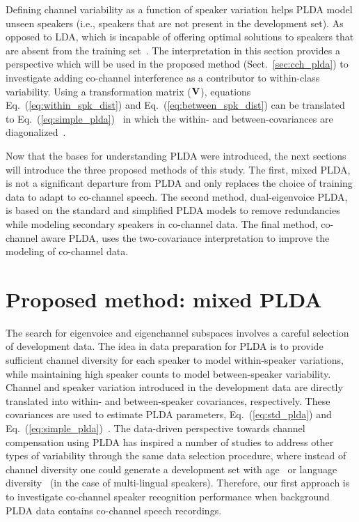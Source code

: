 Defining channel variability as a function of speaker variation helps PLDA model unseen speakers (i.e., speakers that are not present in the development set). 
As opposed to LDA, which is incapable of offering optimal solutions to speakers that are absent from the training set~\cite{ioffePLDA2006}. 
The interpretation in this section provides a perspective which will be used in the proposed method (Sect.~\ref{sec:cch_plda}) to investigate adding co-channel interference as a contributor to within-class variability. 
Using a transformation matrix (${\bf V}$), equations Eq.~(\ref{eq:within_spk_dist}) and Eq.~(\ref{eq:between_spk_dist}) can be translated to Eq.~(\ref{eq:simple_plda})~\cite{sizov2014unifying} in which the within- and between-covariances are diagonalized~\cite{ioffePLDA2006}. 

Now that the bases for understanding PLDA were introduced, the next sections will introduce the three proposed methods of this study. The first, mixed PLDA, is not a significant departure from PLDA and only replaces the choice of training data to adapt to co-channel speech. 
The second method, dual-eigenvoice PLDA, is based on the standard and simplified PLDA models to remove redundancies while modeling secondary speakers in co-channel data. 
The final method, co-channel aware PLDA, uses the two-covariance interpretation to improve the modeling of co-channel data. 

\section{Proposed method: mixed PLDA}
\label{ssec:plda_data_prep}
The search for eigenvoice and eigenchannel subspaces involves a careful selection of development data. 
The idea in data preparation for PLDA is to provide sufficient channel diversity for each speaker to model within-speaker variations, while maintaining high speaker counts to model between-speaker variability. 
Channel and speaker variation introduced in the development data are directly translated into within- and between-speaker covariances, respectively. These covariances are used to estimate PLDA parameters, Eq.~(\ref{eq:std_plda}) and Eq.~(\ref{eq:simple_plda})~\cite{sizov2014unifying}. 
The data-driven perspective towards channel compensation using PLDA has inspired a number of studies to address other types of variability through the same data selection procedure, where instead of channel diversity one could generate a development set with age~\cite{kelly2013,kellyscore2016trans} or language diversity~\cite{misra2014languagemismatch} (in the case of multi-lingual speakers). 
Therefore, our first approach is to investigate co-channel speaker recognition performance when background PLDA data contains co-channel speech recordings. 

